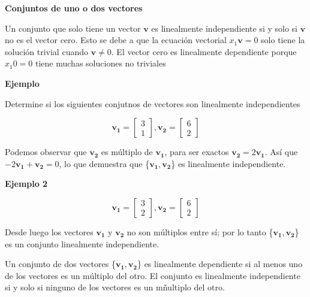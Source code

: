 \documentclass{article}
\begin{document}
\begin{large}
    \textbf{Conjuntos de uno o dos vectores}
\end{large}

Un conjunto que solo tiene un vector $\mathbf{v}$ es linealmente independiente si y solo si $\mathbf{v}$ no es el vector cero. Esto se debe a que la ecuación vectorial $x_1\mathbf{v} = 0$ solo tiene la solución trivial cuando $\mathbf{v} \neq 0$. El vector cero es linealmente dependiente porque $x_{1}0=0$
tiene muchas soluciones no triviales

\begin{large}
    \textbf{Ejemplo}
\end{large}

Determine si los siguientes conjutnos de vectores son linealmente independientes

\begin{equation*}
    \mathbf{v_1} = \begin{bmatrix} 3\\1  \end{bmatrix},
    \mathbf{v_2} = \begin{bmatrix} 6\\2  \end{bmatrix}
\end{equation*}

Podemos observar que $\mathbf{v_2}$ es múltiplo de $\mathbf{v_1}$, para ser exactos $\mathbf{v_2} = 2\mathbf{v_1}$. Así que $-2\mathbf{v_1} + \mathbf{v_2}= 0$, lo que demuestra que \{$\mathbf{v_1}, \mathbf{v_2}$\} es linealmente independiente.

\begin{large}
    \textbf{Ejemplo 2}
\end{large}

\begin{equation*}
    \mathbf{v_1} = \begin{bmatrix} 3\\2  \end{bmatrix},
    \mathbf{v_2} = \begin{bmatrix} 6\\2  \end{bmatrix}
\end{equation*}

Desde luego los vectores $\mathbf{v_1}$ y $\mathbf{v_2}$ no son múltiplos entre sí; por lo tanto \{$\mathbf{v_1}, \mathbf{v_2}$\} es un conjunto linealmente independiente.

\begin{tcolorbox}[colback=red!10!white, colframe=red!70!black, title=Conjunto de 2 vectores]
    Un conjunto de dos vectores \{$\mathbf{v_1}, \mathbf{v_2}$\} es linealmente dependiente si al menos uno de los vectores es un múltiplo del otro. El conjunto es linealmente independiente si y solo si ninguno de los vectores es un mñultiplo del otro.
\end{tcolorbox}
\end{document}
